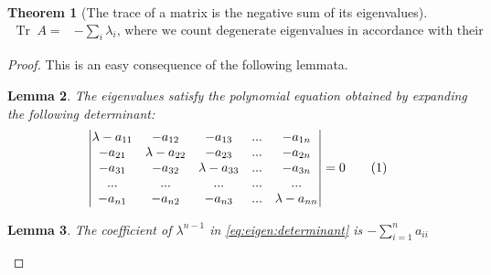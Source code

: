 \documentclass[]{article}
\newcommand\numberthis{\addtocounter{equation}{1}\tag{\theequation}}
\newtheorem{thm}{Theorem}
\newtheorem{lemma}[thm]{Lemma}
\DeclareMathOperator{\Tr}{Tr \;}
\begin{document}
\begin{thm}[The trace of a matrix is the negative sum of its eigenvalues]\label{thm:sum:ev}
	\begin{align*}
		\Tr A =& - \sum_i \lambda_i \text{, where we count degenerate eigenvalues in accordance with their multiplicity.}
	\end{align*}
\end{thm}

\begin{proof}
	This is an easy consequence of the following lemmata. 
	\begin{lemma}\label{lemma:ev:determinant}
		The eigenvalues satisfy the polynomial equation obtained by expanding the following determinant:
		\begin{align*}
			\begin{vmatrix}
				\lambda-a_{11}&-a_{12}&-a_{13}&...&-a_{1n}\\
				-a_{21}&\lambda-a_{22}&-a_{23}&...&-a_{2n}\\
				-a_{31}&-a_{32}&\lambda-a_{33}&...&-a_{3n}\\
				...&...&...&...&...\\
				-a_{n1}&-a_{n2}&-a_{n3}&...&\lambda-a_{nn}
			\end{vmatrix}=0\numberthis\label{eq:eigen:determinant}
		\end{align*}
	\end{lemma}

	\begin{lemma}\label{lemma:coeff:sum}
		The coefficient of $\lambda^{n-1}$  in \eqref{eq:eigen:determinant} is $-\sum_{i=1}^{n} a_{ii}$
	\end{lemma}


\end{proof}
\end{document}
